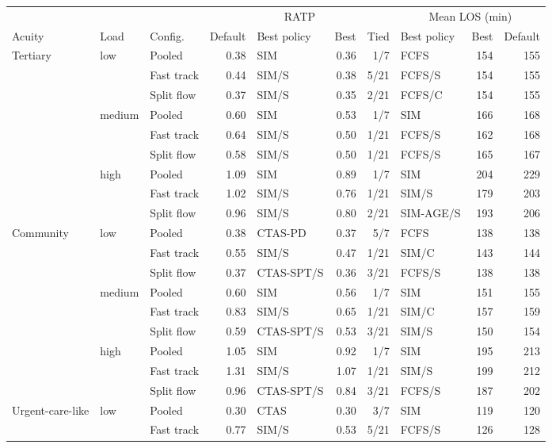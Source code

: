 \begin{tabular}{lllrlrr lrr}
\toprule
 & & & \multicolumn{4}{c}{RATP} & \multicolumn{3}{c}{Mean LOS (min)} \\
\cmidrule(lr){4-7}\cmidrule(lr){8-10}
Acuity & Load & Config. & Default & Best policy & Best & Tied & Best policy & Best & Default \\
\midrule
Tertiary & low & Pooled & 0.38 & SIM & 0.36 & 1/7 & FCFS & 154 & 155 \\
 &  & Fast track & 0.44 & SIM/S & 0.38 & 5/21 & FCFS/S & 154 & 155 \\
 &  & Split flow & 0.37 & SIM/S & 0.35 & 2/21 & FCFS/C & 154 & 155 \\
\addlinespace[1pt]
 & medium & Pooled & 0.60 & SIM & 0.53 & 1/7 & SIM & 166 & 168 \\
 &  & Fast track & 0.64 & SIM/S & 0.50 & 1/21 & FCFS/S & 162 & 168 \\
 &  & Split flow & 0.58 & SIM/S & 0.50 & 1/21 & FCFS/S & 165 & 167 \\
\addlinespace[1pt]
 & high & Pooled & 1.09 & SIM & 0.89 & 1/7 & SIM & 204 & 229 \\
 &  & Fast track & 1.02 & SIM/S & 0.76 & 1/21 & SIM/S & 179 & 203 \\
 &  & Split flow & 0.96 & SIM/S & 0.80 & 2/21 & SIM-AGE/S & 193 & 206 \\
\addlinespace[1pt]
Community & low & Pooled & 0.38 & CTAS-PD & 0.37 & 5/7 & FCFS & 138 & 138 \\
 &  & Fast track & 0.55 & SIM/S & 0.47 & 1/21 & SIM/C & 143 & 144 \\
 &  & Split flow & 0.37 & CTAS-SPT/S & 0.36 & 3/21 & FCFS/S & 138 & 138 \\
\addlinespace[1pt]
 & medium & Pooled & 0.60 & SIM & 0.56 & 1/7 & SIM & 151 & 155 \\
 &  & Fast track & 0.83 & SIM/S & 0.65 & 1/21 & SIM/C & 157 & 159 \\
 &  & Split flow & 0.59 & CTAS-SPT/S & 0.53 & 3/21 & SIM/S & 150 & 154 \\
\addlinespace[1pt]
 & high & Pooled & 1.05 & SIM & 0.92 & 1/7 & SIM & 195 & 213 \\
 &  & Fast track & 1.31 & SIM/S & 1.07 & 1/21 & SIM/S & 199 & 212 \\
 &  & Split flow & 0.96 & CTAS-SPT/S & 0.84 & 3/21 & FCFS/S & 187 & 202 \\
\addlinespace[1pt]
Urgent-care-like & low & Pooled & 0.30 & CTAS & 0.30 & 3/7 & SIM & 119 & 120 \\
 &  & Fast track & 0.77 & SIM/S & 0.53 & 5/21 & FCFS/S & 126 & 128 \\

\end{tabular}
